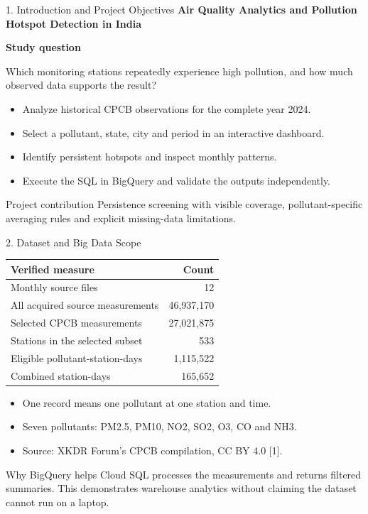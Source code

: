 \documentclass[aspectratio=169,10pt]{beamer}
\begin{document}
\begin{frame}{1. Introduction and Project Objectives}
\textbf{Air Quality Analytics and Pollution Hotspot Detection in India}
\medskip

\textbf{Study question}\par
Which monitoring stations repeatedly experience high pollution, and how much observed data supports the result?
\medskip
\begin{itemize}\setlength\itemsep{3mm}
\item Analyze historical CPCB observations for the complete year 2024.
\item Select a pollutant, state, city and period in an interactive dashboard.
\item Identify persistent hotspots and inspect monthly patterns.
\item Execute the SQL in BigQuery and validate the outputs independently.
\end{itemize}
\begin{block}{Project contribution}
Persistence screening with visible coverage, pollutant-specific averaging rules and explicit missing-data limitations.
\end{block}
\end{frame}

\begin{frame}{2. Dataset and Big Data Scope}
\begin{center}\begin{tabular}{lr}\toprule
Verified measure & Count\\\midrule
Monthly source files & 12\\
All acquired source measurements & 46,937,170\\
Selected CPCB measurements & 27,021,875\\
Stations in the selected subset & 533\\
Eligible pollutant-station-days & 1,115,522\\
Combined station-days & 165,652\\\bottomrule
\end{tabular}\end{center}
\begin{itemize}
\item One record means one pollutant at one station and time.
\item Seven pollutants: PM2.5, PM10, NO2, SO2, O3, CO and NH3.
\item Source: XKDR Forum's CPCB compilation, CC BY 4.0 [1].
\end{itemize}
\begin{block}{Why BigQuery helps}
Cloud SQL processes the measurements and returns filtered summaries. This demonstrates warehouse analytics without claiming the dataset cannot run on a laptop.
\end{block}
\end{frame}
\end{document}
